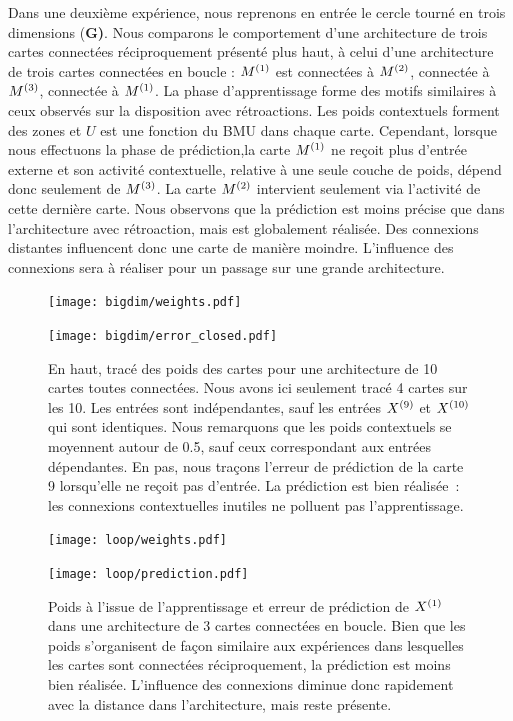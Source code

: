 \documentclass[../main]{subfiles}
\begin{document}
Dans une deuxième expérience, nous reprenons en entrée le cercle tourné en trois dimensions (\textbf{G)}. Nous comparons le comportement d'une architecture de trois cartes connectées réciproquement présenté plus haut, à celui d'une architecture de trois cartes connectées en boucle : $M^{({1})}$ est connectées à $M^{({2})}$, connectée à $M^{({3})}$, connectée à $M^{({1})}$. 
La phase d'apprentissage forme des motifs similaires à ceux observés sur la disposition avec rétroactions. Les poids contextuels forment des zones et $U$ est une fonction du BMU dans chaque carte. 
Cependant, lorsque nous effectuons la phase de prédiction,la carte $M^{({1})}$ ne reçoit plus d'entrée externe et son activité contextuelle, relative à une seule couche de poids, dépend donc seulement de $M^{({3})}$. La carte $M^{({2})}$ intervient seulement via l'activité de cette dernière carte.
Nous observons que la prédiction est moins précise que dans l'architecture avec rétroaction, mais est globalement réalisée. Des connexions distantes influencent donc une carte de manière moindre. L'influence des connexions sera à réaliser pour un passage sur une grande architecture.



\begin{figure}
	\begin{minipage}{\textwidth}
	\texttt{[image: bigdim/weights.pdf]}
	\end{minipage}
\begin{minipage}{\textwidth}
	\centering\texttt{[image: bigdim/error\_closed.pdf]}
	\caption{En haut, tracé des poids des cartes pour une architecture de 10 cartes toutes connectées. Nous avons ici seulement tracé 4 cartes sur les 10. Les entrées sont indépendantes, sauf les entrées $X^{({9})}$ et $X^{({10})}$ qui sont identiques. Nous remarquons que les poids contextuels se moyennent autour de 0.5, sauf ceux correspondant aux entrées dépendantes. En pas, nous traçons l'erreur de prédiction de la carte 9 lorsqu'elle ne reçoit pas d'entrée. La prédiction est bien réalisée~: les connexions contextuelles inutiles ne polluent pas l'apprentissage. \label{fig:bigdim}}
\end{minipage}
\end{figure}

\begin{figure}
	\begin{minipage}{\textwidth}
		\centering\texttt{[image: loop/weights.pdf]}
	\end{minipage}
	\begin{minipage}{\textwidth}
		\centering\texttt{[image: loop/prediction.pdf]}
		\caption{Poids à l'issue de l'apprentissage et erreur de prédiction de $X^{({1})}$ dans une architecture de 3 cartes connectées en boucle. Bien que les poids s'organisent de façon similaire aux expériences dans lesquelles les cartes sont connectées réciproquement, la prédiction est moins bien réalisée. L'influence des connexions diminue donc rapidement avec la distance dans l'architecture, mais reste présente.\label{fig:3som_loop}}
	\end{minipage}
\end{figure}
\end{document}
